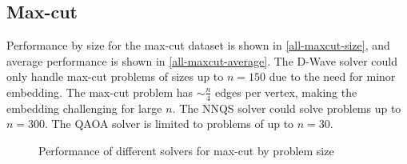 \subsection{Max-cut}
Performance by size for the max-cut dataset is shown in \autoref{all-maxcut-size}, and average performance is shown in \autoref{all-maxcut-average}. The D-Wave solver could only handle max-cut problems of sizes up to $n=150$ due to the need for minor embedding. The max-cut problem has $\sim \frac{n}{4}$ edges per vertex, making the embedding challenging for large $n$. The NNQS solver could solve problems up to $n=300$. The QAOA solver is limited to problems of up to $n=30$.

\begin{figure}[!htb]
    \centering
    \caption{Performance of different solvers for max-cut by problem size}
    \label{all-maxcut-size}
\end{figure}

